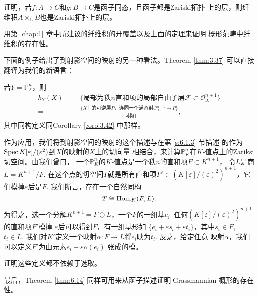 \begin{exe}\label{exe:6.15}
\begin{compactenum}[(a)]
\item 证明，若$f:A\to C$和$g:B\to C$是函子同态，且函子都是Zariski拓扑
    上的层，则纤维积$A\times_C B$也是Zariski拓扑上的层。
\item 用第 \ref{chap:1} 章中所建议的纤维积的开覆盖以及上面的定理来证明
    概形范畴中纤维积的存在性。
\end{compactenum}
\end{exe}

下面的例子给出了到射影空间的映射的另一种看法。Theorem \ref{thm:3.37}
可以直接翻译为我们的新语言：

\begin{thm}\label{thm:6.16}
若$Y=\mathbb P_{\mathbb Z}^n$，则
\begin{align*}
h_Y(X)=&
\;\{\text{局部为秩$n$直和项的局部自由子层$\mathscr F\subset 
\mathscr O_X^{n+1}$}\}\\
=&\; \frac{\{\text{$X$上的可逆层$P$，连同一个满态射$\mathscr O_X^{n+1}
\to P$}\}}{\{\text{同构}\}},
\end{align*}
其中同构定义同Corollary \ref{coro:3.42} 中那样。
\end{thm}

作为应用，我们将到射影空间的映射的这个描述与在第 \ref{s:6.1.3} 节描述
的作为$\operatorname{Spec} K[\varepsilon]/(\varepsilon^2)$到$X$的映射的$X$上的切向量
相结合，来计算$\mathbb P_K^n$在$K$-值点上的Zariksi切空间。由我们曾曰，
一个$\mathbb P_K^n$的$K$-值点是一个秩$n$的直和项$F\subset K^{n+1}$，
令$L$是商$L=K^{n+1}/F$. 在这个点的切空间$T$就是所有直和项$F'\subset 
(K[\varepsilon]/(\varepsilon)^2)^{n+1}$，它们模掉$\varepsilon$后是$F$.
我们断言，存在一个自然同构
\[
T\cong \operatorname{Hom}_K(F,L).   
\]
为得之，选一个分解$K^{n+1}=F\oplus L$，一个$F$的一组基$e_i$. 
任何$(K[\varepsilon]/(\varepsilon)^2)^{n+1}$的直和项$F'$模掉
$\varepsilon$后可以得到$F$，有一组基形如
$\{e_i+\varepsilon s_i+\varepsilon t_i\}$，其中$s_i\in F$, $t_i\in L$.
我们对$K'$定义一个映射$\alpha:F\to L$将$e_i$映为$t_i$. 反之，给定任意
映射$\alpha$，我们可以定义$F'$为由元素$e_i+\varepsilon\alpha(e_i)$
张成的模。

\begin{exe}\label{exe:6.17}
证明这些定义都不依赖于选取。
\end{exe}

最后，Theorem \ref{thm:6.14} 同样可用来从函子描述证明 Grassmannian
概形的存在性。

